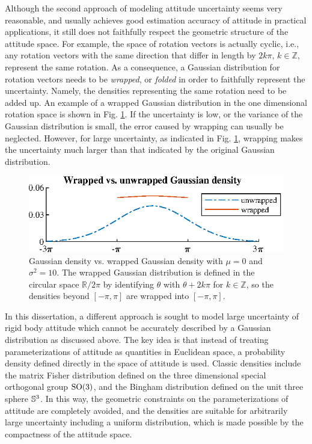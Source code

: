 Although the second approach of modeling attitude uncertainty seems very reasonable, and usually achieves good estimation accuracy of attitude in practical applications, it still does not faithfully respect the geometric structure of the attitude space.
For example, the space of rotation vectors is actually cyclic, i.e., any rotation vectors with the same direction that differ in length by $2k\pi$, $k\in\mathbb{Z}$, represent the same rotation.
As a consequence, a Gaussian distribution for rotation vectors needs to be \textit{wrapped}, or \textit{folded} in order to faithfully represent the uncertainty.
Namely, the densities representing the same rotation need to be added up.
An example of a wrapped Gaussian distribution in the one dimensional rotation space is shown in Fig. \ref{fig:wrapping}.
If the uncertainty is low, or the variance of the Gaussian distribution is small, the error caused by wrapping can usually be neglected.
However, for large uncertainty, as indicated in Fig. \ref{fig:wrapping}, wrapping makes the uncertainty much larger than that indicated by the original Gaussian distribution.

\begin{figure}
	\centering
	\includegraphics[scale=1.2]{figures/wrapping}
	\caption{Gaussian density vs. wrapped Gaussian density with $\mu=0$ and $\sigma^2=10$.
		The wrapped Gaussian distribution is defined in the circular space $\mathbb{R}/2\pi$ by identifying $\theta$ with $\theta+2k\pi$ for $k\in\mathbb{Z}$, so the densities beyond $[-\pi,\pi]$ are wrapped into $[-\pi,\pi]$. \label{fig:wrapping}}
\end{figure}

In this dissertation, a different approach is sought to model large uncertainty of rigid body attitude which cannot be accurately described by a Gaussian distribution as discussed above.
The key idea is that instead of treating parameterizations of attitude as quantities in Euclidean space, a probability density defined directly in the space of attitude is used.
Classic densities include the matrix Fisher distribution defined on the three dimensional special orthogonal group $\mathrm{SO}(3)$, and the Bingham distribution defined on the unit three sphere $\mathbb{S}^3$.
In this way, the geometric constraints on the parameterizations of attitude are completely avoided, and the densities are suitable for arbitrarily large uncertainty including a uniform distribution, which is made possible by the compactness of the attitude space.

